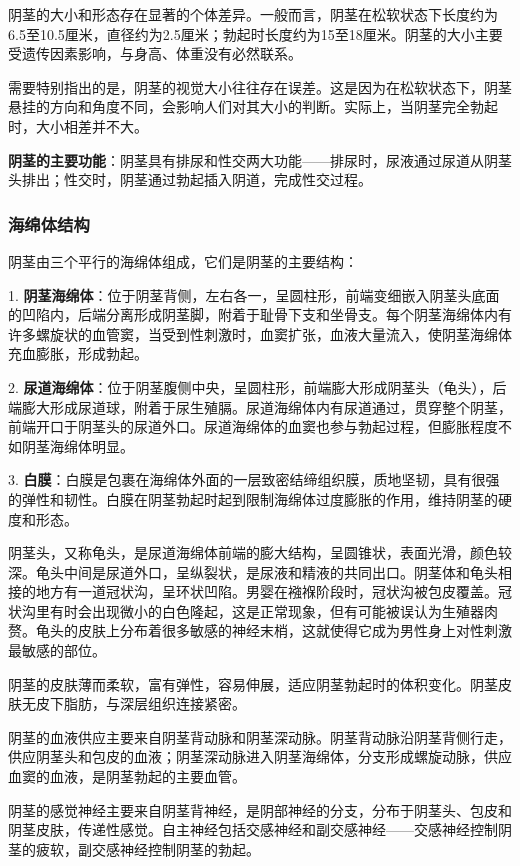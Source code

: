 阴茎的大小和形态存在显著的个体差异。一般而言，阴茎在松软状态下长度约为6.5至10.5厘米，直径约为2.5厘米；勃起时长度约为15至18厘米。阴茎的大小主要受遗传因素影响，与身高、体重没有必然联系。

需要特别指出的是，阴茎的视觉大小往往存在误差。这是因为在松软状态下，阴茎悬挂的方向和角度不同，会影响人们对其大小的判断。实际上，当阴茎完全勃起时，大小相差并不大。

\textbf{阴茎的主要功能}：阴茎具有排尿和性交两大功能——排尿时，尿液通过尿道从阴茎头排出；性交时，阴茎通过勃起插入阴道，完成性交过程。

\subsubsection{海绵体结构}

阴茎由三个平行的海绵体组成，它们是阴茎的主要结构：

1. \textbf{阴茎海绵体}：位于阴茎背侧，左右各一，呈圆柱形，前端变细嵌入阴茎头底面的凹陷内，后端分离形成阴茎脚，附着于耻骨下支和坐骨支。每个阴茎海绵体内有许多螺旋状的血管窦，当受到性刺激时，血窦扩张，血液大量流入，使阴茎海绵体充血膨胀，形成勃起。

2. \textbf{尿道海绵体}：位于阴茎腹侧中央，呈圆柱形，前端膨大形成阴茎头（龟头），后端膨大形成尿道球，附着于尿生殖膈。尿道海绵体内有尿道通过，贯穿整个阴茎，前端开口于阴茎头的尿道外口。尿道海绵体的血窦也参与勃起过程，但膨胀程度不如阴茎海绵体明显。

3. \textbf{白膜}：白膜是包裹在海绵体外面的一层致密结缔组织膜，质地坚韧，具有很强的弹性和韧性。白膜在阴茎勃起时起到限制海绵体过度膨胀的作用，维持阴茎的硬度和形态。

阴茎头，又称龟头，是尿道海绵体前端的膨大结构，呈圆锥状，表面光滑，颜色较深。龟头中间是尿道外口，呈纵裂状，是尿液和精液的共同出口。阴茎体和龟头相接的地方有一道冠状沟，呈环状凹陷。男婴在襁褓阶段时，冠状沟被包皮覆盖。冠状沟里有时会出现微小的白色隆起，这是正常现象，但有可能被误认为生殖器肉赘。龟头的皮肤上分布着很多敏感的神经末梢，这就使得它成为男性身上对性刺激最敏感的部位。

阴茎的皮肤薄而柔软，富有弹性，容易伸展，适应阴茎勃起时的体积变化。阴茎皮肤无皮下脂肪，与深层组织连接紧密。

阴茎的血液供应主要来自阴茎背动脉和阴茎深动脉。阴茎背动脉沿阴茎背侧行走，供应阴茎头和包皮的血液；阴茎深动脉进入阴茎海绵体，分支形成螺旋动脉，供应血窦的血液，是阴茎勃起的主要血管。

阴茎的感觉神经主要来自阴茎背神经，是阴部神经的分支，分布于阴茎头、包皮和阴茎皮肤，传递性感觉。自主神经包括交感神经和副交感神经——交感神经控制阴茎的疲软，副交感神经控制阴茎的勃起。

